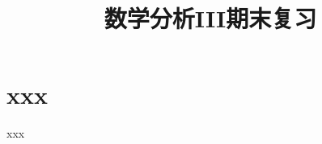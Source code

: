 \everymath{\displaystyle}



\title[数分III\\
期末复习]{\texorpdfstring{\Huge \bfseries 数学分析III期末复习}{数学分析III期末复习}} %
\date{}





\begin{frame}

\titlepage %

\end{frame}




\section{xxx}


\begin{frame}{xxx}



\end{frame}




